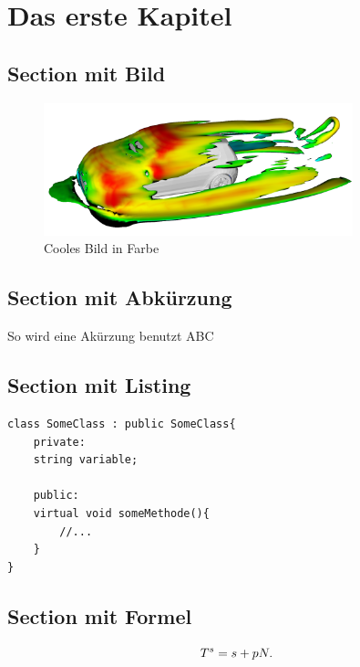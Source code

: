 
\chapter{Das erste Kapitel}
\blindtext 

\clearpage
\section{Section mit Bild}

\begin{figure}[h] 
	\centering
	\includegraphics[width=0.8\textwidth]{img/kap1/gitSimu}
	\caption{Cooles Bild in Farbe}
	\label{fig:bild}
\end{figure} 


\section{Section mit Abkürzung}
So wird eine Akürzung benutzt \ac{ABC}

\section{Section mit Listing}
\begin{lstlisting}[caption = SomeClass., label=cs:someClass]
class SomeClass : public SomeClass{
	private:
	string variable;
	
	public:
	virtual void someMethode(){
		//...
	}
}
\end{lstlisting}

\section{Section mit Formel}
\begin{equation}
T^{s} = s + pN.
\formelentry{Problemlösezeit seriell bei schwacher Skalierung}
\label{eq:seriellSchwachSkal}
\end{equation}
